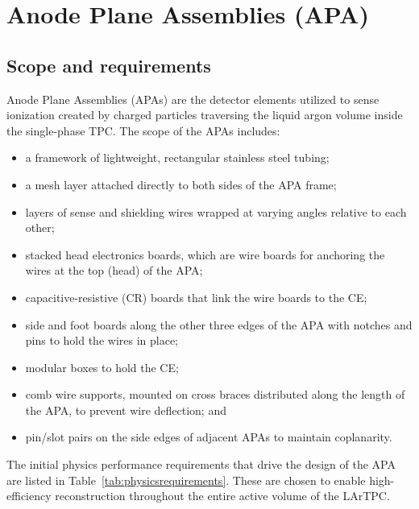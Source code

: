 
\section{Anode Plane Assemblies (APA)}

\subsection{Scope and requirements}

Anode Plane Assemblies (APAs) are the detector elements utilized to sense ionization created by charged particles traversing the liquid argon volume inside the single-phase TPC.  The scope of the APAs includes:
\begin{itemize}
\item a framework of lightweight, rectangular stainless steel tubing;
\item a mesh layer attached directly to both sides of the APA frame;
\item layers of sense and shielding wires wrapped at varying angles relative to each other;
\item stacked head electronics boards, which are wire boards for anchoring the wires at the top (head) of the APA;
\item capacitive-resistive (CR) boards that link the wire boards to the CE;
\item side and foot boards along the other three edges of the APA with notches and pins to hold the wires in place;
\item modular boxes to hold the CE;
\item comb wire supports, mounted on cross braces distributed along the length of the APA, to prevent wire deflection; and
\item pin/slot pairs on the side edges of adjacent APAs to maintain coplanarity.
\end{itemize}

The initial physics performance requirements that drive the design of the APA are listed in Table~\ref{tab:physicsrequirements}.  These are chosen to enable high-efficiency reconstruction throughout the entire active volume of the LArTPC.  

